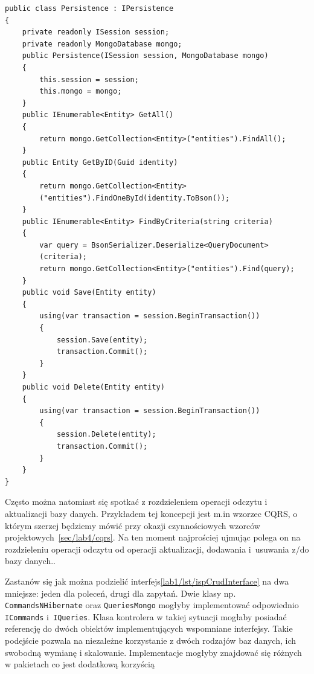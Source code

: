 \begin{lstlisting}[caption={Implementacja interfejsu \texttt{IPersistence}}, label={lab1/lst/ispCrudInterfaceImplementation}]
public class Persistence : IPersistence
{
	private readonly ISession session;
	private readonly MongoDatabase mongo;
	public Persistence(ISession session, MongoDatabase mongo)
	{
		this.session = session;
		this.mongo = mongo;
	}
	public IEnumerable<Entity> GetAll()
	{
		return mongo.GetCollection<Entity>("entities").FindAll();
	}
	public Entity GetByID(Guid identity)
	{
		return mongo.GetCollection<Entity>
		("entities").FindOneById(identity.ToBson());
	}
	public IEnumerable<Entity> FindByCriteria(string criteria)
	{
		var query = BsonSerializer.Deserialize<QueryDocument>
		(criteria);
		return mongo.GetCollection<Entity>("entities").Find(query);
	}
	public void Save(Entity entity)
	{
		using(var transaction = session.BeginTransaction())
		{
			session.Save(entity);
			transaction.Commit();
		}
	}
	public void Delete(Entity entity)
	{
		using(var transaction = session.BeginTransaction())
		{
			session.Delete(entity);
			transaction.Commit();
		}
	}
}
\end{lstlisting}
Często można natomiast się spotkać z rozdzieleniem operacji odczytu i aktualizacji bazy danych. Przykładem tej koncepcji jest m.in wzorzec CQRS, o którym szerzej będziemy mówić przy okazji czynnościowych wzorców projektowych~\ref{sec/lab4/cqrs}. Na ten moment najprościej ujmując polega on na rozdzieleniu operacji odczytu od operacji aktualizacji, dodawania i~usuwania z/do bazy danych.. 

Zastanów się jak można podzielić interfejs\ref{lab1/lst/ispCrudInterface} na dwa mniejsze: jeden dla poleceń, drugi dla zapytań. Dwie klasy np. \texttt{CommandsNHibernate} oraz \texttt{QueriesMongo} mogłyby implementować odpowiednio \texttt{ICommands} i~\texttt{IQueries}. Klasa kontrolera w takiej sytuacji mogłaby posiadać referencję do dwóch obiektów implementujących wspomniane interfejsy. Takie podejście pozwala na niezależne korzystanie z dwóch rodzajów baz danych, ich swobodną wymianę i skalowanie. Implementacje mogłyby znajdować się różnych w pakietach co jest dodatkową korzyścią 


